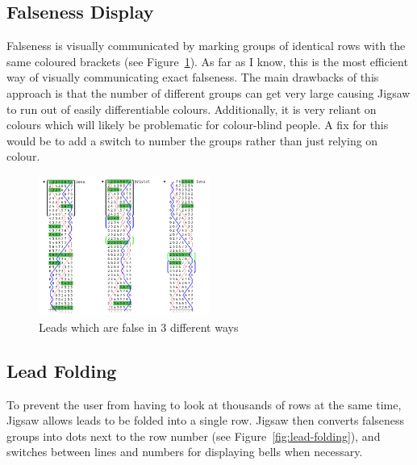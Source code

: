 \documentclass[12pt]{article}
\begin{document}
\subsection{Falseness Display}

Falseness is visually communicated by marking groups of identical rows with the same coloured
brackets (see Figure~\ref{fig:falseness}).  As far as I know, this is the most efficient way of
visually communicating exact falseness.  The main drawbacks of this approach is that the number of
different groups can get very large causing Jigsaw to run out of easily differentiable colours.
Additionally, it is very reliant on colours which will likely be problematic for colour-blind
people.  A fix for this would be to add a switch to number the groups rather than just relying on
colour.

\begin{figure}
    \centering
    \includegraphics[width=0.5\textwidth]{falseness-clean}
    \caption{Leads which are false in 3 different ways}\label{fig:falseness}
\end{figure}

\subsection{Lead Folding}

To prevent the user from having to look at thousands of rows at the same time, Jigsaw allows leads
to be folded into a single row.  Jigsaw then converts falseness groups into dots next to the row
number (see Figure~\ref{fig:lead-folding}), and switches between lines and numbers for displaying
bells when necessary.
\end{document}
